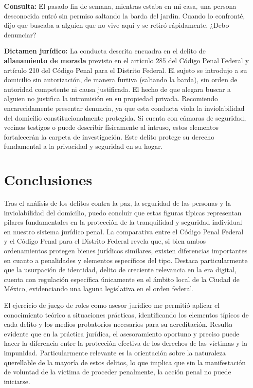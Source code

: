 \documentclass[12pt,letterpaper]{article}
\begin{document}
\textbf{Consulta:} El pasado fin de semana, mientras estaba en mi casa, una persona desconocida entró sin permiso saltando la barda del jardín. Cuando lo confronté, dijo que buscaba a alguien que no vive aquí y se retiró rápidamente. ¿Debo denunciar?

\textbf{Dictamen jurídico:} La conducta descrita encuadra en el delito de \textbf{allanamiento de morada} previsto en el artículo 285 del Código Penal Federal y artículo 210 del Código Penal para el Distrito Federal. El sujeto se introdujo a su domicilio sin autorización, de manera furtiva (saltando la barda), sin orden de autoridad competente ni causa justificada. El hecho de que alegara buscar a alguien no justifica la intromisión en su propiedad privada. Recomiendo encarecidamente presentar denuncia, ya que esta conducta viola la inviolabilidad del domicilio constitucionalmente protegida. Si cuenta con cámaras de seguridad, vecinos testigos o puede describir físicamente al intruso, estos elementos fortalecerán la carpeta de investigación. Este delito protege su derecho fundamental a la privacidad y seguridad en su hogar.


\section{Conclusiones}

Tras el análisis de los delitos contra la paz, la seguridad de las personas y la inviolabilidad del domicilio, puedo concluir que estas figuras típicas representan pilares fundamentales en la protección de la tranquilidad y seguridad individual en nuestro sistema jurídico penal. La comparativa entre el Código Penal Federal y el Código Penal para el Distrito Federal revela que, si bien ambos ordenamientos protegen bienes jurídicos similares, existen diferencias importantes en cuanto a penalidades y elementos específicos del tipo. Destaca particularmente que la usurpación de identidad, delito de creciente relevancia en la era digital, cuenta con regulación específica únicamente en el ámbito local de la Ciudad de México, evidenciando una laguna legislativa en el orden federal.

El ejercicio de juego de roles como asesor jurídico me permitió aplicar el conocimiento teórico a situaciones prácticas, identificando los elementos típicos de cada delito y los medios probatorios necesarios para su acreditación. Resulta evidente que en la práctica jurídica, el asesoramiento oportuno y preciso puede hacer la diferencia entre la protección efectiva de los derechos de las víctimas y la impunidad. Particularmente relevante es la orientación sobre la naturaleza querellable de la mayoría de estos delitos, lo que implica que sin la manifestación de voluntad de la víctima de proceder penalmente, la acción penal no puede iniciarse.
\end{document}
